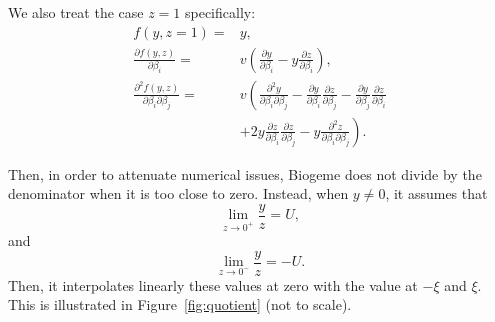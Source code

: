 \documentclass[12pt,a4paper]{article}
\begin{document}
\begin{description}
  We also treat the case $z=1$ specifically:
   \begin{align*}
    f(y, z=1) =& y, \\
    \frac{\partial f(y, z)}{\partial \beta_i} =& v\left(\frac{\partial y}{\partial \beta_i}   - y \frac{\partial z}{\partial \beta_i}\right), \\
    \frac{\partial^2 f(y, z)}{\partial \beta_i \partial \beta_j} =&
    v\left( \frac{\partial^2 y}{\partial \beta_i \partial \beta_j} 
    -   \frac{\partial y}{\partial \beta_i}  \frac{\partial z}{\partial \beta_j}
    -  \frac{\partial y}{\partial \beta_j}  \frac{\partial z}{\partial \beta_i}\right. \\
 & \left.  + 2 y  \frac{\partial z}{\partial \beta_i}  \frac{\partial z}{\partial \beta_j}
    - y  \frac{\partial^2 z}{\partial \beta_i \partial \beta_j} \right).
   \end{align*}
   
   

  
  
Then, in order to attenuate numerical issues, Biogeme does not divide by the denominator when it is too close to zero. Instead, when $y \neq 0$, it assumes that
  \[
\lim_{z \to 0^+} \frac{y}{z} = U,
  \]
  and
  \[
\lim_{z \to 0^-} \frac{y}{z} = -U.
\]
Then, it interpolates linearly these values at zero with the value at $-\xi$ and  $\xi$.
This is illustrated in Figure~\vref{fig:quotient} (not to scale).

  \begin{figure}[htb]
  \begin{center}
\end{center}
\end{figure}
\end{description}
\end{document}
